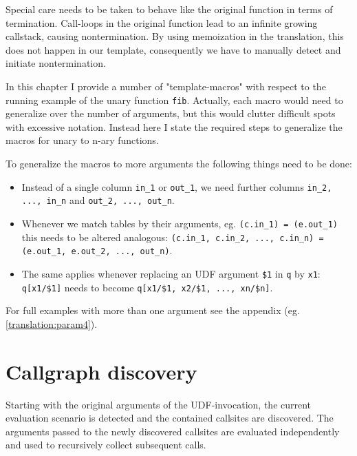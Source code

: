 Special care needs to be taken to behave like the original function in terms of termination. Call-loops in the original function lead to an infinite growing callstack, causing nontermination. By using memoization in the translation, this does not happen in our template, consequently we have to manually detect and initiate nontermination.

In this chapter I provide a number of "template-macros" with respect to the running example of the unary function \texttt{fib}. Actually, each macro would need to generalize over the number of arguments, but this would clutter difficult spots with excessive notation. Instead here I state the required steps to generalize the macros for unary to n-ary functions.

To generalize the macros to more arguments the following things need to be done:
\begin{itemize}
    \item Instead of a single column \texttt{in\_1} or \texttt{out\_1}, we need further columns \texttt{in\_2, ..., in\_n} and \texttt{out\_2, ..., out\_n}.
    \item Whenever we match tables by their arguments, eg. \texttt{(c.in\_1) = (e.out\_1)} this needs to be altered analogous: \texttt{(c.in\_1, c.in\_2, ..., c.in\_n) = (e.out\_1, e.out\_2, ..., out\_n)}.
    \item The same applies whenever replacing an UDF argument \texttt{\$1} in \texttt{q} by \texttt{x1}: \texttt{q[x1/\$1]} needs to become \texttt{q[x1/\$1, x2/\$1, ..., xn/\$n]}.
\end{itemize}

For full examples with more than one argument see the appendix (eg. \autoref{translation:param4}). 

\section{Callgraph discovery}

Starting with the original arguments of the UDF-invocation, the current evaluation scenario is detected and the contained callsites are discovered. The arguments passed to the newly discovered callsites are evaluated independently and used to recursively collect subsequent calls.

